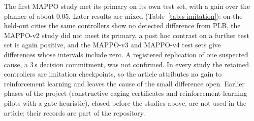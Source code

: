 \documentclass[preprint,12pt]{elsarticle}
\begin{document}
The first MAPPO study met its primary on its own test set, with a gain over the planner of about 0.05. Later results
are mixed (Table~\ref{tab:s-imitation}): on the held-out cities the same controllers show no detected difference from
PLB, the MAPPO-v2 study did not meet its primary, a post hoc contrast on a further test set is again positive, and
the MAPPO-v3 and MAPPO-v4 test sets give differences whose intervals include zero. A registered replication of one suspected cause, a 3\,s decision commitment, was not confirmed. In every
study the retained controllers are imitation checkpoints, so the article attributes no gain to reinforcement learning
and leaves the cause of the small difference open.
Earlier phases of the project (constructive caging certificates and reinforcement-learning pilots with a gate
heuristic), closed before the studies above, are not used in the article; their records are part of the repository.
\end{document}
